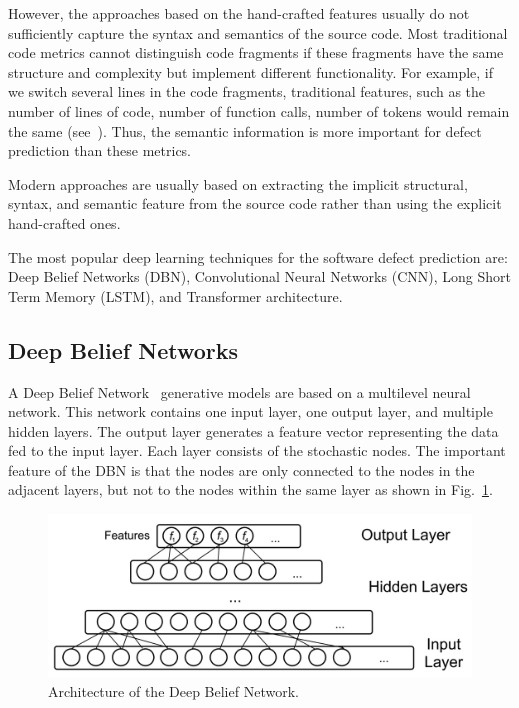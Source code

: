 \documentclass[mathematics,review,submit,moreauthors,pdftex]{Definitions/mdpi}
\begin{document}
However, the approaches based on the hand-crafted features usually do not sufficiently capture the syntax and semantics of the source code. 
Most traditional code metrics cannot distinguish code fragments if these fragments have the same structure and complexity but implement different functionality.
For example, if we switch several lines in the code fragments, traditional features, such as the number of lines of code, number of function calls, number of tokens would remain the same (see~\cite{WangEtAl2016}). Thus, the semantic information is more important for defect prediction than these metrics.

Modern approaches are usually based on extracting the implicit structural, syntax, and semantic feature from the source code rather than using the explicit hand-crafted ones.

The most popular deep learning techniques for the software defect prediction are: Deep Belief Networks (DBN), Convolutional Neural Networks (CNN), Long Short Term Memory (LSTM), and Transformer architecture.

\subsection{Deep Belief Networks}

A Deep Belief Network~\cite{Bengio2009dbn} generative models are based on a multilevel neural network. This network contains one input layer, one output layer, and multiple hidden layers. The output layer generates a feature vector representing the data fed to the input layer. Each layer consists of the stochastic nodes. The important feature of the DBN is that the nodes are only connected to the nodes in the adjacent layers, but not to the nodes within the same layer as shown in Fig.~\ref{fig2}.

\begin{figure}[ht] %
\centering
\includegraphics[width=10.5 cm]{f2.png}
\caption{Architecture of the Deep Belief Network.}
\label{fig2} %
\end{figure}
\end{document}
